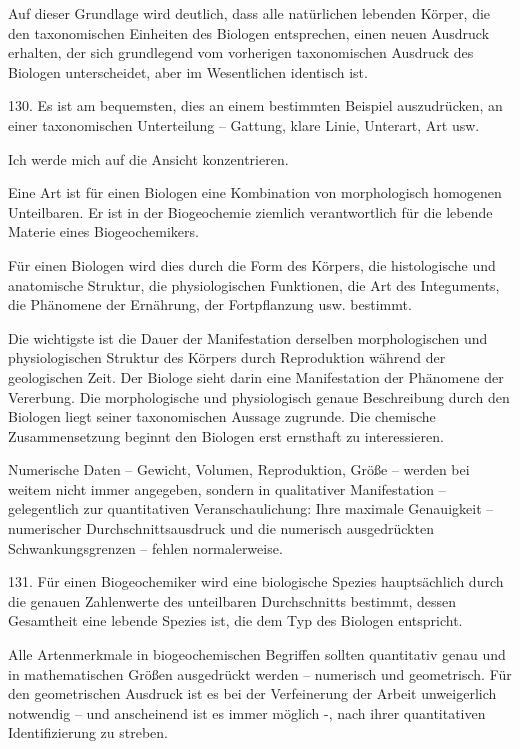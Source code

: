 \documentclass[11pt,a4paper]{book}
\begin{document}
Auf dieser Grundlage wird deutlich, dass alle natürlichen lebenden Körper, die den taxonomischen Einheiten des Biologen entsprechen, einen neuen Ausdruck erhalten, der sich grundlegend vom vorherigen taxonomischen Ausdruck des Biologen unterscheidet, aber im Wesentlichen identisch ist.



130. Es ist am bequemsten, dies an einem bestimmten Beispiel auszudrücken, an einer taxonomischen Unterteilung -- Gattung, klare Linie, Unterart, Art usw.



Ich werde mich auf die Ansicht konzentrieren.



Eine Art ist für einen Biologen eine Kombination von morphologisch homogenen Unteilbaren. Er ist in der Biogeochemie ziemlich verantwortlich für die lebende Materie eines Biogeochemikers.



Für einen Biologen wird dies durch die Form des Körpers, die histologische und anatomische Struktur, die physiologischen Funktionen, die Art des Integuments, die Phänomene der Ernährung, der Fortpflanzung usw. bestimmt.



Die wichtigste ist die Dauer der Manifestation derselben morphologischen und physiologischen Struktur des Körpers durch Reproduktion während der geologischen Zeit. Der Biologe sieht darin eine Manifestation der Phänomene der Vererbung. Die morphologische und physiologisch genaue Beschreibung durch den Biologen liegt seiner taxonomischen Aussage zugrunde. Die chemische Zusammensetzung beginnt den Biologen erst ernsthaft zu interessieren.



Numerische Daten -- Gewicht, Volumen, Reproduktion, Größe -- werden bei weitem nicht immer angegeben, sondern in qualitativer Manifestation -- gelegentlich zur quantitativen Veranschaulichung: Ihre maximale Genauigkeit -- numerischer Durchschnittsausdruck und die numerisch ausgedrückten Schwankungsgrenzen -- fehlen normalerweise.



131. Für einen Biogeochemiker wird eine biologische Spezies hauptsächlich durch die genauen Zahlenwerte des unteilbaren Durchschnitts bestimmt, dessen Gesamtheit eine lebende Spezies ist, die dem Typ des Biologen entspricht.



Alle Artenmerkmale in biogeochemischen Begriffen sollten quantitativ genau und in mathematischen Größen ausgedrückt werden -- numerisch und geometrisch. Für den geometrischen Ausdruck ist es bei der Verfeinerung der Arbeit unweigerlich notwendig -- und anscheinend ist es immer möglich -, nach ihrer quantitativen Identifizierung zu streben.
\end{document}
